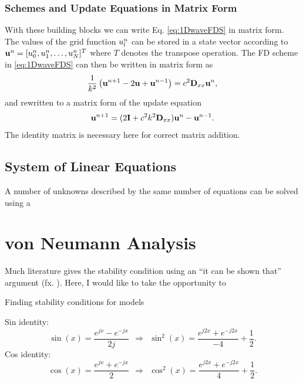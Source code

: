\subsubsection{Schemes and Update Equations in Matrix Form}
With these building blocks we can write Eq. \eqref{eq:1DwaveFDS} in matrix form. The values of the grid function $u_l^n$ can be stored in a state vector according to $\mathbf{u}^n = [u_0^n, u_1^n, \hdots, u_N^n]^T$ where $T$ denotes the transpose operation. The FD scheme in \eqref{eq:1DwaveFDS} can then be written in matrix form as
\begin{equation}\label{eq:1DwaveMatrix}
    \frac{1}{k^2}\left(\mathbf{u}^{n+1} - 2 \mathbf{u} + \mathbf{u}^{n-1}\right) = c^2 \mathbf{D}_{xx} \mathbf{u}^n,
\end{equation}
and rewritten to a matrix form of the update equation
\begin{equation}
    \mathbf{u}^{n+1} = (2\mathbf{I} + c^2k^2 \mathbf{D}_{xx} )\mathbf{u}^n - \mathbf{u}^{n-1}.
\end{equation}
The identity matrix is necessary here for correct matrix addition.

\subsection{System of Linear Equations}
A number of unknowns described by the same number of equations can be solved using a 

\section{von Neumann Analysis}\label{sec:stabilityAnalysis}
Much literature gives the stability condition using an ``it can be shown that'' argument (fx. \cite{Bilbao2009}). Here, I would like to take the opportunity to 

Finding stability conditions for models

Sin identity:
\begin{equation}\label{eq:sinIdentity}
    \sin(x) = \frac{e^{jx} - e^{-jx}}{2j}\ \ \Rightarrow \ \ \sin^2(x) %
    = \frac{e^{j2x} + e^{-j2x}}{-4} + \frac{1}{2}.
\end{equation}
Cos identity:
\begin{equation}\label{eq:cosIdentity}
    \cos(x) = \frac{e^{jx} + e^{-jx}}{2}\ \ \Rightarrow \ \ \cos^2(x) %
    = \frac{e^{j2x} + e^{-j2x}}{4} + \frac{1}{2}.
\end{equation}

